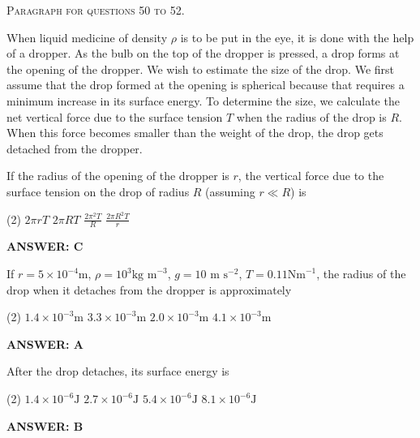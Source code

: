 
\begin{center}
    \textsc{Paragraph for questions 50 to 52.}
\end{center}

When liquid medicine of density $\rho$ is to be put in the eye, it is done with the help of a dropper. As the bulb on the top of the dropper is pressed, a drop forms at the opening of the dropper. We wish to estimate the size of the drop. We first assume that the drop formed at the opening is spherical because that requires a minimum increase in its surface energy. To determine the size, we calculate the net vertical force due to the surface tension $T$ when the radius of the drop is $R$. When this force becomes smaller than the weight of the drop, the drop gets detached from the dropper.

\begin{center}
\end{center}

\item If the radius of the opening of the dropper is $r$, the vertical force due to the surface tension on the drop of radius $R$ (assuming $r \ll R$) is
    \begin{tasks}(2)
        \task $2\pi rT$
        \task $2\pi RT$
        \task $\frac{2\pi^2T}{R}$
        \task $\frac{2\pi R^2T}{r}$
    \end{tasks}
    \textbf{ANSWER: C}

\item If $r=5\times10^{-4} \text{m}$, $\rho=10^3 \text{kg m}^{-3}$, $g=10 \text{ m s}^{-2}$, $T=0.11\text{Nm}^{-1}$, the radius of the drop when it detaches from the dropper is approximately
    \begin{tasks}(2)
        \task $1.4\times10^{-3} \text{m}$
        \task $3.3\times10^{-3} \text{m}$
        \task $2.0\times10^{-3} \text{m}$
        \task $4.1\times10^{-3} \text{m}$
    \end{tasks}
    \textbf{ANSWER: A}

\item After the drop detaches, its surface energy is
    \begin{tasks}(2)
        \task $1.4\times10^{-6} \text{J}$
        \task $2.7\times10^{-6} \text{J}$
        \task $5.4\times10^{-6} \text{J}$
        \task $8.1\times10^{-6} \text{J}$
    \end{tasks}
    \textbf{ANSWER: B}
